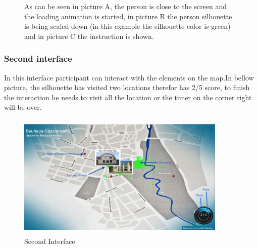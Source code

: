 \begin{figure}[!htb]
    \centering
    \caption{As can be seen in picture A, the person is close to the screen and the loading animation is started, in picture B the person silhouette is being scaled down (in this example the silhouette color is green) and in picture C the instruction is shown. }%
    \label{fig:Switching_between_phases_body}%
\end{figure}


\subsubsection{Second interface}
In this interface participant can interact with the elements on the map.In bellow picture, the silhouette has visited two locations therefor has 2/5 score, to finish the interaction he needs to visit all the location or the timer on the corner right will be over.
\begin{figure}[H]
    \centering
    \includegraphics[width=100mm,height=60mm]{Figures/7/body_interactive/second_interface}
    \caption{Second Interface}%
    \label{fig:body_secondinterface}%
\end{figure}

